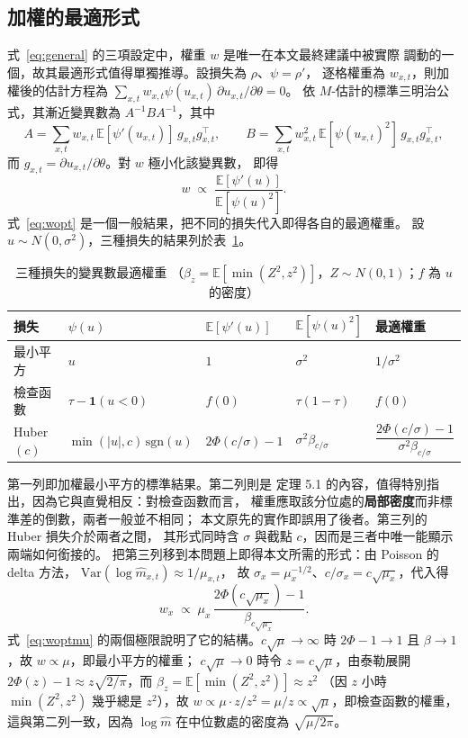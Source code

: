 \documentclass[UTF8, fontset=macnew, a4paper, 12pt]{ctexart}
\newcommand{\Ex}{\mathbb{E}}
\begin{document}
\subsection{加權的最適形式}\label{sec:weight}

式~\eqref{eq:general} 的三項設定中，權重 $w$ 是唯一在本文最終建議中被實際
調動的一個，故其最適形式值得單獨推導。設損失為 $\rho$、$\psi=\rho'$，
逐格權重為 $w_{x,t}$，則加權後的估計方程為
$\sum_{x,t}w_{x,t}\psi(u_{x,t})\,\partial u_{x,t}/\partial\theta=0$。
依 $M$-估計的標準三明治公式，其漸近變異數為 $A^{-1}BA^{-1}$，其中
\[
A=\sum_{x,t} w_{x,t}\,\Ex[\psi'(u_{x,t})]\,g_{x,t}g_{x,t}^{\top},\qquad
B=\sum_{x,t} w_{x,t}^{2}\,\Ex[\psi(u_{x,t})^{2}]\,g_{x,t}g_{x,t}^{\top},
\]
而 $g_{x,t}=\partial u_{x,t}/\partial\theta$。對 $w$ 極小化該變異數，
即得
\begin{equation}\label{eq:wopt}
w\;\propto\;\frac{\Ex[\psi'(u)]}{\Ex[\psi(u)^{2}]} .
\end{equation}
式~\eqref{eq:wopt} 是一個一般結果，把不同的損失代入即得各自的最適權重。
設 $u\sim N(0,\sigma^2)$，三種損失的結果列於表~\ref{tab:wcases}。

\begin{table}[H]
\centering
\caption{三種損失的變異數最適權重
（$\beta_z=\Ex[\min(Z^2,z^2)]$，$Z\sim N(0,1)$；$f$ 為 $u$ 的密度）}
\small
\begin{tabular}{lllll}
\toprule
損失 & $\psi(u)$ & $\Ex[\psi'(u)]$ & $\Ex[\psi(u)^2]$ & 最適權重\\
\midrule
最小平方 & $u$ & $1$ & $\sigma^2$ & $1/\sigma^2$\\
檢查函數 & $\tau-\mathbf{1}(u<0)$ & $f(0)$ & $\tau(1-\tau)$ & $f(0)$\\
Huber$(c)$ & $\min(|u|,c)\,\mathrm{sgn}(u)$ & $2\Phi(c/\sigma)-1$
  & $\sigma^2\beta_{c/\sigma}$ & $\dfrac{2\Phi(c/\sigma)-1}{\sigma^2\beta_{c/\sigma}}$\\
\bottomrule
\end{tabular}
\label{tab:wcases}
\end{table}

第一列即加權最小平方的標準結果。第二列則是 \citet[第 5.3 節]{koenker2005}
定理 5.1 的內容，值得特別指出，因為它與直覺相反：對檢查函數而言，
權重應取該分位處的\textbf{局部密度}而非標準差的倒數，兩者一般並不相同；
本文原先的實作即誤用了後者。第三列的 Huber 損失介於兩者之間，
其形式同時含 $\sigma$ 與截點 $c$，因而是三者中唯一能顯示兩端如何銜接的。
把第三列移到本問題上即得本文所需的形式：由 Poisson 的 delta 方法，
$\mathrm{Var}(\log\hat m_{x,t})\approx1/\mu_{x,t}$，
故 $\sigma_x=\mu_x^{-1/2}$、$c/\sigma_x=c\sqrt{\mu_x}$，代入得
\begin{equation}\label{eq:woptmu}
w_x\;\propto\;\mu_x\,\frac{2\Phi(c\sqrt{\mu_x})-1}{\beta_{c\sqrt{\mu_x}}} .
\end{equation}
式~\eqref{eq:woptmu} 的兩個極限說明了它的結構。$c\sqrt{\mu}\to\infty$ 時
$2\Phi-1\to1$ 且 $\beta\to1$，故 $w\propto\mu$，即最小平方的權重；
$c\sqrt{\mu}\to0$ 時令 $z=c\sqrt{\mu}$，由泰勒展開
$2\Phi(z)-1\approx z\sqrt{2/\pi}$，而 $\beta_z=\Ex[\min(Z^2,z^2)]\approx z^2$
（因 $z$ 小時 $\min(Z^2,z^2)$ 幾乎總是 $z^2$），故
$w\propto\mu\cdot z/z^{2}=\mu/z\propto\sqrt{\mu}$，即檢查函數的權重，這與第二列一致，因為 $\log\hat m$ 在中位數處的密度為 $\sqrt{\mu/2\pi}$。
\end{document}
